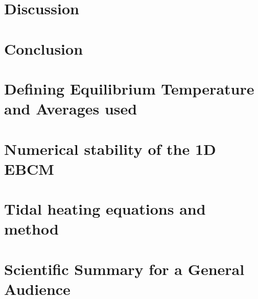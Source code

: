 \documentclass[12pt, onecolumn]{revtex4-2}    %
\begin{document}
\section{Discussion} \label{sec:Discussion}

\section{Conclusion} \label{sec:Conclusion}






\clearpage

\appendix

\section{Defining Equilibrium Temperature and Averages used} \label{appx:EquilTempAverages}

\section{Numerical stability of the 1D EBCM} \label{appx:NumStability}

\section{Tidal heating equations and method} \label{appx:TidalHeatingEquationsMethod}

\clearpage

\section*{Scientific Summary for a General Audience}
\end{document}
